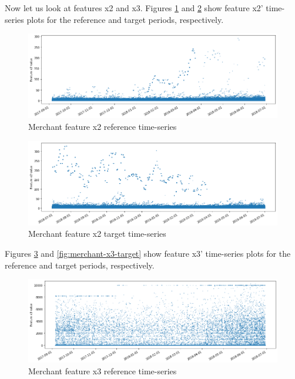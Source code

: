 Now let us look at features x2 and x3. Figures \ref{fig:merchant-x2-reference} and \ref{fig:merchant-x2-target} show feature x2' time-series plots for the reference and target periods, respectively.
\begin{figure}[!htb]
    \begin{center}
      \includegraphics[scale=0.5]{figures/merchant-x2-reference.png}
      \caption{Merchant feature x2 reference time-series}
      \label{fig:merchant-x2-reference}
    \end{center}
\end{figure}
\begin{figure}[!htb]
    \begin{center}
      \includegraphics[scale=0.5]{figures/merchant-x2-target.png}
      \caption{Merchant feature x2 target time-series}
      \label{fig:merchant-x2-target}
    \end{center}
\end{figure}
Figures \ref{fig:merchant-x3-reference} and \ref{fig:merchant-x3-target} show feature x3' time-series plots for the reference and target periods, respectively.
\begin{figure}[!htb]
    \begin{center}
      \includegraphics[scale=0.5]{figures/merchant-x3-reference.png}
      \caption{Merchant feature x3 reference time-series}
      \label{fig:merchant-x3-reference}
    \end{center}
\end{figure}

